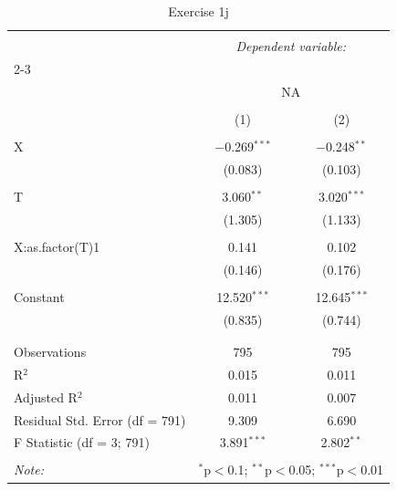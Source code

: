 
\begin{table}[!htbp] \centering 
  \caption{Exercise 1j} 
  \label{} 
\begin{tabular}{@{\extracolsep{5pt}}lcc} 
\\[-1.8ex]\hline 
\hline \\[-1.8ex] 
 & \multicolumn{2}{c}{\textit{Dependent variable:}} \\ 
\cline{2-3} 
\\[-1.8ex] & \multicolumn{2}{c}{NA} \\ 
\\[-1.8ex] & (1) & (2)\\ 
\hline \\[-1.8ex] 
 X & $-$0.269$^{***}$ & $-$0.248$^{**}$ \\ 
  & (0.083) & (0.103) \\ 
  & & \\ 
 T & 3.060$^{**}$ & 3.020$^{***}$ \\ 
  & (1.305) & (1.133) \\ 
  & & \\ 
 X:as.factor(T)1 & 0.141 & 0.102 \\ 
  & (0.146) & (0.176) \\ 
  & & \\ 
 Constant & 12.520$^{***}$ & 12.645$^{***}$ \\ 
  & (0.835) & (0.744) \\ 
  & & \\ 
\hline \\[-1.8ex] 
Observations & 795 & 795 \\ 
R$^{2}$ & 0.015 & 0.011 \\ 
Adjusted R$^{2}$ & 0.011 & 0.007 \\ 
Residual Std. Error (df = 791) & 9.309 & 6.690 \\ 
F Statistic (df = 3; 791) & 3.891$^{***}$ & 2.802$^{**}$ \\ 
\hline 
\hline \\[-1.8ex] 
\textit{Note:}  & \multicolumn{2}{r}{$^{*}$p$<$0.1; $^{**}$p$<$0.05; $^{***}$p$<$0.01} \\ 
\end{tabular} 
\end{table} 
